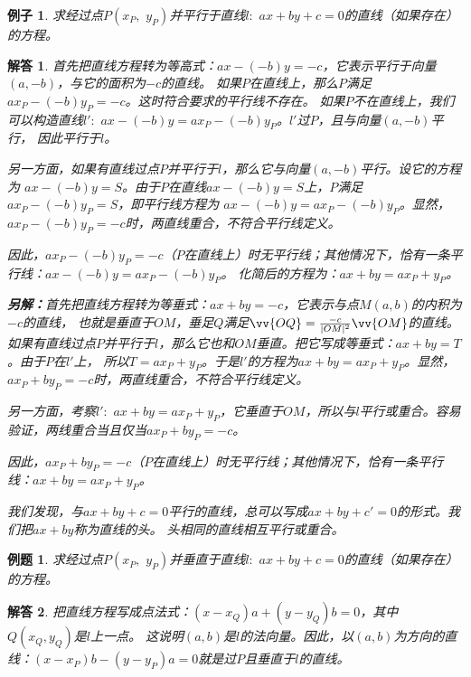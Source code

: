 \documentclass[12pt,UTF8]{ctexbook}
\newtheorem{et}{例题}[section]
\newtheorem{ex}{例子}[section]
\newtheorem*{so}{解答}
\begin{document}
\begin{ex}
    求经过点$P(x_P, \,\,y_P)$并平行于直线$l: \,\, ax + by + c = 0$的直线（如果存在）的方程。
\end{ex}
\begin{so}
首先把直线方程转为等高式：$ax - (-b)y = -c$，它表示平行于向量$(a, -b)$，与它的面积为$-c$的直线。
如果$P$在直线上，那么$P$满足$ax_P - (-b)y_P = -c$。这时符合要求的平行线不存在。
如果$P$不在直线上，我们可以构造直线$l' : \,\, ax - (-b)y = ax_P - (-b)y_P$。$l'$过$P$，且与向量$(a, -b)$平行，
因此平行于$l$。

另一方面，如果有直线过点$P$并平行于$l$，那么它与向量$(a, -b)$平行。设它的方程为
$ax - (-b)y = S$。由于$P$在直线$ax - (-b)y = S$上，$P$满足$ax_P - (-b)y_P = S$，即平行线方程为
$ax - (-b)y = ax_P - (-b)y_P$。显然，$ax_P - (-b)y_P = -c$时，两直线重合，不符合平行线定义。

因此，$ax_P - (-b)y_P = -c$（$P$在直线上）时无平行线；其他情况下，恰有一条平行线：$ax - (-b)y = ax_P - (-b)y_P$。
化简后的方程为：$ax + by = ax_P + y_P$。

\textbf{另解：}首先把直线方程转为等垂式：$ax + by = -c$，它表示与点$M(a, b)$的内积为$-c$的直线，
也就是垂直于$OM$，垂足$Q$满足$\vv{OQ} = \frac{-c}{|OM|^2}\vv{OM}$的直线。
如果有直线过点$P$并平行于$l$，那么它也和$OM$垂直。把它写成等垂式：$ax + by = T$。由于$P$在$l'$上，
所以$T = ax_P + y_P$。于是$l'$的方程为$ax + by = ax_P + y_P$。显然，$ax_P + by_P = -c$时，两直线重合，不符合平行线定义。

另一方面，考察$l' : \,\, ax + by = ax_P + y_P$，它垂直于$OM$，所以与$l$平行或重合。容易验证，两线重合当且仅当$ax_P + by_P = -c$。

因此，$ax_P + by_P = -c$（$P$在直线上）时无平行线；其他情况下，恰有一条平行线：$ax + by = ax_P + y_P$。

我们发现，与$ax + by + c = 0$平行的直线，总可以写成$ax + by + c' = 0$的形式。我们把$ax + by$称为直线的头。
头相同的直线相互平行或重合。
\end{so}

\begin{et}
    求经过点$P(x_P, \,\,y_P)$并垂直于直线$l: \,\, ax + by + c = 0$的直线（如果存在）的方程。
\end{et}
\begin{so}
    把直线方程写成点法式：$(x - x_Q)a + (y - y_Q)b = 0$，其中$Q(x_Q, y_Q)$是$l$上一点。
这说明$(a, b)$是$l$的法向量。因此，以$(a, b)$为方向的直线：$(x - x_P)b - (y - y_P)a = 0$就是过$P$且垂直于$l$的直线。
\end{so}
\end{document}
